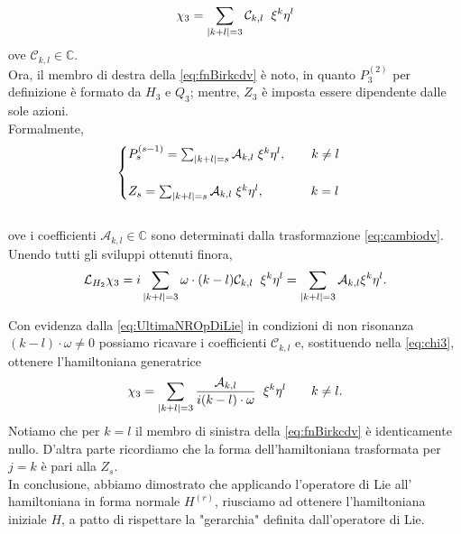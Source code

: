 \documentclass[a4paper,11pt,titlepage]{report}
\theoremstyle{definition}
\theoremstyle{plain}
\begin{document}
\begin{equation}
	\label{eq:chi3}
	\chi_3= \sum_{|k+l|=3} \mathcal{C}_{k,l} \hspace{2mm} \xi^k \eta^l
\end{equation}
ove $\mathcal{C}_{k,l} \in \mathbb{C}$.
\\Ora, il membro di destra della \ref{eq:fnBirkcdv} è noto, in quanto $P_3^{(2)}$ per definizione è formato da $H_3$ e $Q_3$; mentre, $Z_3$ è imposta essere dipendente dalle sole azioni.
\\Formalmente, 
$$\begin{cases}
	P_s^{(s-1)} = \sum_{|k+l|=s}\mathcal{A}_{k,l} \hspace{1mm} \xi^k \eta^l,  \qquad k\neq l  \\\\
	Z_s = \sum_{|k+l|=s}\mathcal{A}_{k,l} \hspace{1mm} \xi^k \eta^l, \qquad \hspace{6mm} k=l\\
\end{cases} $$
\\ove i coefficienti $\mathcal{A}_{k,l} \in \mathbb{C}$ sono determinati dalla trasformazione \ref{eq:cambiodv}.
Unendo tutti gli sviluppi ottenuti finora,
\begin{equation}
	\label{eq:UltimaNROpDiLie}
	\mathcal{L}_{H_2}\chi_3 = i \sum_{|k+l|=3} \omega \cdot (k-l) \mathcal{C}_{k,l} \hspace{2mm} \xi^k \eta^l = 
	\sum_{|k+l|=3} \mathcal{A}_{k,l} \xi^k \eta^l.
\end{equation}

Con evidenza dalla \ref{eq:UltimaNROpDiLie} in condizioni di non risonanza $(k-l) \cdot \omega \neq 0$ possiamo ricavare i coefficienti $\mathcal{C}_{k,l}$ e, sostituendo nella \ref{eq:chi3}, ottenere l'hamiltoniana generatrice $$\chi_3 = \sum_{|k+l|=3} \frac{\mathcal{A}_{k,l}}{i (k-l)\cdot \omega} \hspace{2mm} \xi^k \eta^l \qquad k \neq l. $$
Notiamo che per $k=l$ il membro di sinistra della \ref{eq:fnBirkcdv} è identicamente nullo. D'altra parte ricordiamo che la forma dell'hamiltoniana trasformata per $j=k$ è pari alla $Z_s$.
\\In conclusione, abbiamo dimostrato che applicando l'operatore di Lie all' hamiltoniana in forma normale $H^{(r)}$, riusciamo ad ottenere l'hamiltoniana iniziale $H$, a patto di rispettare la "gerarchia" definita dall'operatore di Lie.
\end{document}
